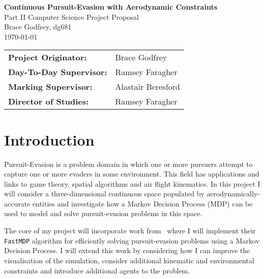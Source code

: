 \documentclass[12pt,a4paper,twoside]{article}
\begin{document}

\begin{titlepage} 

\vspace*{\fill}

\begin{center}
  \Huge
  \textbf{Continuous Pursuit-Evasion with Aerodynamic Constraints} \\[6mm]
  \Large
  Part II Computer Science Project Proposal \\[2mm]
  Brace Godfrey, dg681 \\[2mm]
  \today \\[8mm]
\end{center}

\vspace{150pt}

{\large
\begin{tabular}{ll}
  \bf Project Originator:  & Brace Godfrey          \\[4mm]
  \bf Day-To-Day Supervisor:  & Ramsey Faragher                \\[4mm]
  \bf Marking Supervisor: & Alastair Beresford                   \\[4mm]
  \bf Director of Studies: & Ramsey Faragher                   \\[4mm]
\end{tabular}
}

\vspace{170pt}

\end{titlepage}


\section{Introduction}

Pursuit-Evasion is a problem domain in which one or more pursuers attempt to capture one or more evaders in some environment. This field has applications and links to game theory, spatial algorithms and air flight kinematics. In this project I will consider a three-dimensional continuous space populated by aerodynamically-accurate entities and investigate how a Markov Decision Process (MDP) can be used to model and solve pursuit-evasion problems in this space.

The core of my project will incorporate work from~\cite{BertramWei2021} where I will implement their \texttt{FastMDP} algorithm for efficiently solving pursuit-evasion problems using a Markov Decision Process. I will extend this work by considering how I can improve the visualisation of the simulation, consider additional kinematic and environmental constraints and introduce additional agents to the problem.
\end{document}

